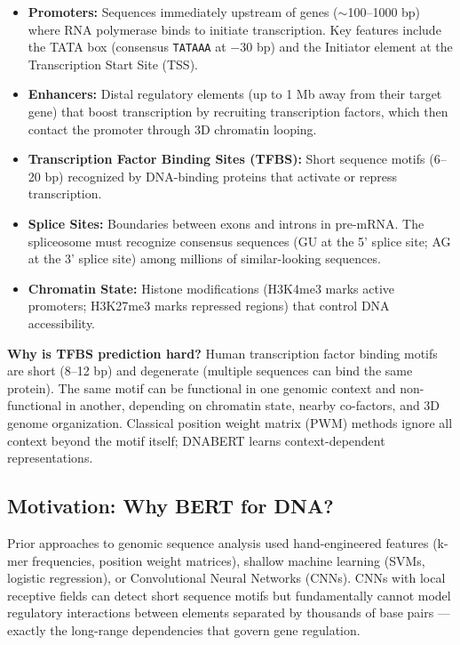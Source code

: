 ﻿\documentclass[12pt,a4paper]{article}
\begin{document}
\begin{itemize}[leftmargin=*, itemsep=4pt]
  \item \textbf{Promoters:} Sequences immediately upstream of genes ($\sim$100--1000 bp) where RNA polymerase binds to initiate transcription. Key features include the TATA box (consensus \texttt{TATAAA} at $-$30 bp) and the Initiator element at the Transcription Start Site (TSS).
  \item \textbf{Enhancers:} Distal regulatory elements (up to 1 Mb away from their target gene) that boost transcription by recruiting transcription factors, which then contact the promoter through 3D chromatin looping.
  \item \textbf{Transcription Factor Binding Sites (TFBS):} Short sequence motifs (6--20 bp) recognized by DNA-binding proteins that activate or repress transcription.
  \item \textbf{Splice Sites:} Boundaries between exons and introns in pre-mRNA. The spliceosome must recognize consensus sequences (GU at the 5' splice site; AG at the 3' splice site) among millions of similar-looking sequences.
  \item \textbf{Chromatin State:} Histone modifications (H3K4me3 marks active promoters; H3K27me3 marks repressed regions) that control DNA accessibility.
\end{itemize}

\begin{comparebox}
\textbf{Why is TFBS prediction hard?} Human transcription factor binding motifs are short (8--12 bp) and degenerate (multiple sequences can bind the same protein). The same motif can be functional in one genomic context and non-functional in another, depending on chromatin state, nearby co-factors, and 3D genome organization. Classical position weight matrix (PWM) methods ignore all context beyond the motif itself; DNABERT learns context-dependent representations.
\end{comparebox}

\subsection{Motivation: Why BERT for DNA?}

Prior approaches to genomic sequence analysis used hand-engineered features (k-mer frequencies, position weight matrices), shallow machine learning (SVMs, logistic regression), or Convolutional Neural Networks (CNNs). CNNs with local receptive fields can detect short sequence motifs but fundamentally cannot model regulatory interactions between elements separated by thousands of base pairs --- exactly the long-range dependencies that govern gene regulation.
\end{document}
